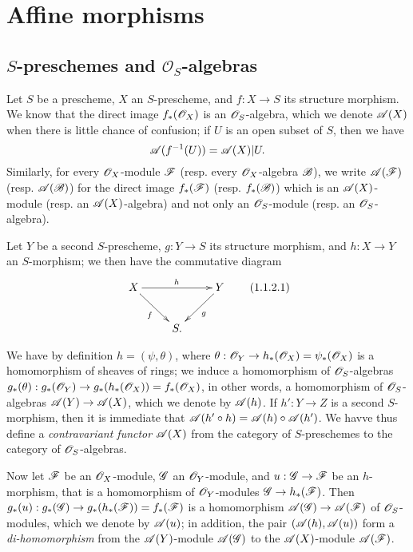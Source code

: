 \section{Affine morphisms}
\label{section:affine-morphisms}

\subsection{$S$-preschemes and $\mathcal{O}_S$-algebras}
\label{subsection:s-preschemes-algebras}

\begin{env}[1.1.1]
\label{2.1.1.1}
Let $S$ be a prescheme, $X$ an $S$-prescheme, and $f:X\to S$ its structure morphism.
We know  that the direct image $f_*(\mathscr{O}_X)$ is an $\mathscr{O}_S$-algebra, which we
denote $\mathscr{A}(X)$ when there is little chance of confusion; if $U$ is an open subset of $S$, then we have
\[
  \mathscr{A}(f^{-1}(U))=\mathscr{A}(X)|U.
\]
Similarly, for every $\mathscr{O}_X$-module $\mathscr{F}$ (resp. every $\mathscr{O}_X$-algebra $\mathscr{B}$), we write $\mathscr{A}(\mathscr{F})$ (resp. $\mathscr{A}(\mathscr{B})$) for the direct image $f_*(\mathscr{F})$ (resp. $f_*(\mathscr{B})$) which is an $\mathscr{A}(X)$-module (resp. an $\mathscr{A}(X)$-algebra) and not only an $\mathscr{O}_S$-module (resp. an $\mathscr{O}_S$-algebra).
\end{env}

\begin{env}[1.1.2]
\label{2.1.1.2}
Let $Y$ be a second $S$-prescheme, $g:Y\to S$ its structure morphism, and $h:X\to Y$ an $S$-morphism; we then have the commutative diagram
\[
  \xymatrix{
    X\ar[rr]^h\ar[rd]_f & &
    Y\ar[ld]^g\\
    & S.
  }
  \tag{1.1.2.1}
\]

We have by definition $h=(\psi,\theta)$, where $\theta:\OO_Y\to h_*(\OO_X)=\psi_*(\OO_X)$ is a homomorphism of sheaves of rings; we induce  a homomorphism of $\mathscr{O}_S$-algebras $g_*(\theta):g_*(\OO_Y)\to g_*(h_*(\OO_X))=f_*(\OO_X)$, in other words, a homomorphism of $\mathscr{O}_S$-algebras $\sh{A}(Y)\to\sh{A}(X)$, which we denote by $\mathscr{A}(h)$.
If $h':Y\to Z$ is a second $S$-morphism, then it is immediate that $\mathscr{A}(h'\circ h)=\mathscr{A}(h)\circ\mathscr{A}(h')$.
We havve thus define a \emph{contravariant functor $\mathscr{A}(X)$} from the category of $S$-preschemes to the category of $\mathscr{O}_S$-algebras.

Now let $\mathscr{F}$ be an $\mathscr{O}_X$-module, $\mathscr{G}$ an $\mathscr{O}_Y$-module, and $u:\sh{G}\to\sh{F}$ be an $h$-morphism, that is  a homomorphism of $\mathscr{O}_Y$-modules $\sh{G}\to h_*(\sh{F})$.
Then $g_*(u):g_*(\sh{G})\to g_*(h_*(\sh{F}))=f_*(\sh{F})$ is a homomorphism $\sh{A}(\sh{G})\to\sh{A}(\sh{F})$ of $\mathscr{O}_S$-modules, which we denote by $\mathscr{A}(u)$; in addition, the pair $(\mathscr{A}(h),\mathscr{A}(u))$ form a \emph{di-homomorphism} from the $\mathscr{A}(Y)$-module $\mathscr{A}(\mathscr{G})$ to the $\mathscr{A}(X)$-module $\mathscr{A}(\mathscr{F})$.
\end{env}

